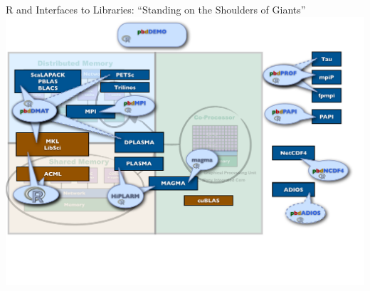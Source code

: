 \begin{frame}{R and \pbdR Interfaces to Libraries: ``Standing on the Shoulders of
  Giants''}
\includegraphics[height=1.05\textheight]
{../common/pics/hardware/ParallelHardware14.pdf}
\end{frame}


